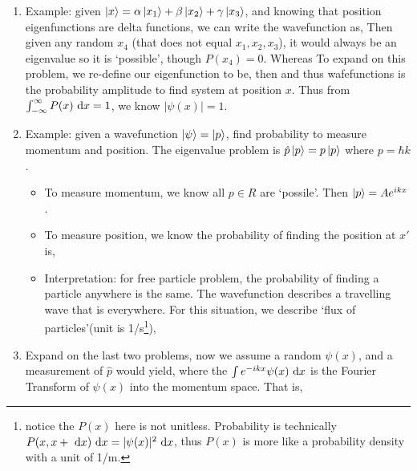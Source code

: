 \documentclass{school-22.101-notes}
\begin{document}
\begin{enumerate}
\item Example: given $\left| x \right> = \alpha \left| x_1 \right> + \beta \left| x_2 \right> + \gamma \left| x_3 \right>$, and knowing that position eigenfunctions are delta functions, we can write the wavefunction as, 
  Then given any random $x_4$ (that does not equal $x_1, x_2, x_3$), it would always be an eigenvalue so it is `possible', though $P(x_4) = 0$. Whereas 
  To expand on this problem, we re-define our eigenfunction to be, 
  then 
  and 
  thus  wafefunctions is the probability amplitude to find system at position $x$. Thus from $\int_{-\infty}^{\infty} P(x) \mbox{ }\mathrm{d} x = 1$, we know $|\psi(x)| = 1$. 
    

\item Example: given a wavefunction $\left| \psi \right> = \left| p \right>$, find probability to measure momentum and position. The eigenvalue problem is $\hat{p} \left| p \right> = p\left| p \right>$ where $p = \hbar k$. 
  \begin{itemize}
  \item To measure momentum, we know all $p \in R$ are `possile'. Then $\left| p \right> = A e^{ikx}$. 
  \item To measure position, we know the probability of finding the position at $x'$ is, 
  \item Interpretation: for free particle problem, the probability of finding a particle anywhere is the same. The wavefunction describes a travelling wave that is everywhere. For this situation, we describe `flux of particles'(unit is 1/s\footnote{notice the $P(x)$ here is not unitless. Probability is technically $P(x,x+\mbox{ }\mathrm{d} x) \mbox{ }\mathrm{d} x = |\psi(x)|^2 \mbox{ }\mathrm{d} x$, thus $P(x)$ is more like a probability density with a unit of 1/m.}), 
  \end{itemize}

\item Expand on the last two problems, now we assume a random $\psi(x)$, and a measurement of $\hat{p}$ would yield, 
  where the $\int e^{-ikx} \psi(x) \mbox{ }\mathrm{d} x $ is the Fourier Transform of $\psi(x)$ into the momentum space. That is, 


\end{enumerate}
\end{document}
